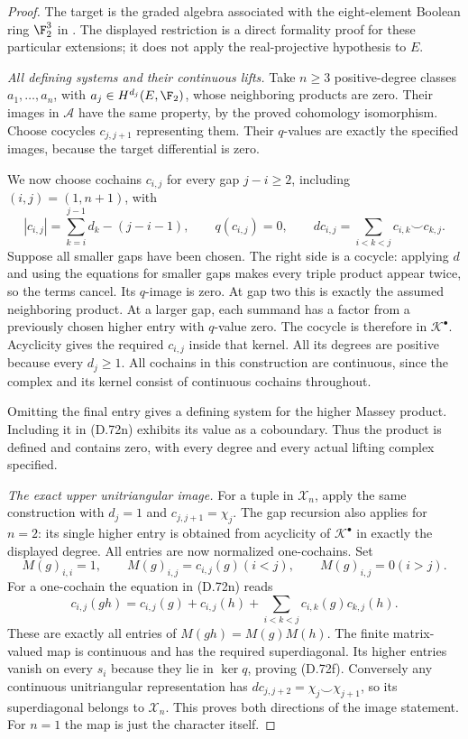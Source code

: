 \begin{proof}
The target is the graded algebra associated with
the eight-element Boolean ring $\F_2^3$ in
\cite[Definition~6.1]{R-PalQuick2025}. The displayed
restriction is a direct formality proof for these
particular extensions; it does not apply the
real-projective hypothesis to $E$.

\emph{All defining systems and their continuous lifts.}
Take $n\geq3$ positive-degree classes $a_1,\ldots,a_n$, with
$a_j\in H^{d_j}(E,\F_2)$, whose neighboring products
are zero. Their images in $\mathcal A$ have the
same property, by the proved cohomology isomorphism.
Choose cocycles $c_{j,j+1}$ representing them.
Their $q$-values are exactly the specified images,
because the target differential is zero.

We now choose cochains $c_{i,j}$ for every gap
$j-i\geq2$, including $(i,j)=(1,n+1)$, with
\[
 |c_{i,j}|=\sum_{k=i}^{j-1}d_k-(j-i-1),\qquad
 q(c_{i,j})=0,\qquad
 dc_{i,j}=\sum_{i<k<j}c_{i,k}\smile c_{k,j}.
                                                               \tag{D.72n}
\]
Suppose all smaller gaps have been chosen.
The right side is a cocycle: applying $d$ and
using the equations for smaller gaps makes every
triple product appear twice, so the terms cancel.
Its $q$-image is zero. At gap two this is exactly
the assumed neighboring product. At a larger gap,
each summand has a factor from a previously chosen
higher entry with $q$-value zero. The cocycle is
therefore in $\mathcal K^\bullet$. Acyclicity gives
the required $c_{i,j}$ inside that kernel. All its
degrees are positive because every $d_j\geq1$.
All cochains in this construction are continuous,
since the complex and its kernel consist of
continuous cochains throughout.

Omitting the final entry gives a defining system
for the higher Massey product. Including it in
(D.72n) exhibits its value as a coboundary. Thus
the product is defined and contains zero, with
every degree and every actual lifting complex
specified.

\emph{The exact upper unitriangular image.}
For a tuple in $\mathcal X_n$, apply the same
construction with $d_j=1$ and $c_{j,j+1}=\chi_j$.
The gap recursion also applies for $n=2$: its single
higher entry is obtained from acyclicity of
$\mathcal K^\bullet$ in exactly the displayed degree.
All entries are now normalized one-cochains.
Set
\[
   M(g)_{i,i}=1,\qquad M(g)_{i,j}=c_{i,j}(g) (i<j),
                   \qquad M(g)_{i,j}=0 (i>j).
                                                               \tag{D.72o}
\]
For a one-cochain the equation in (D.72n) reads
\[
 c_{i,j}(gh)=c_{i,j}(g)+c_{i,j}(h)
                     +\sum_{i<k<j}c_{i,k}(g)c_{k,j}(h).
\]
These are exactly all entries of $M(gh)=M(g)M(h)$.
The finite matrix-valued map is continuous and
has the required superdiagonal. Its higher
entries vanish on every $s_i$ because they lie
in $\ker q$, proving (D.72f). Conversely any
continuous unitriangular representation has
\(d c_{j,j+2}=\chi_j\smile\chi_{j+1}\), so its
superdiagonal belongs to $\mathcal X_n$.
This proves both directions of the image statement.
For $n=1$ the map is just the character itself.


\end{proof}
